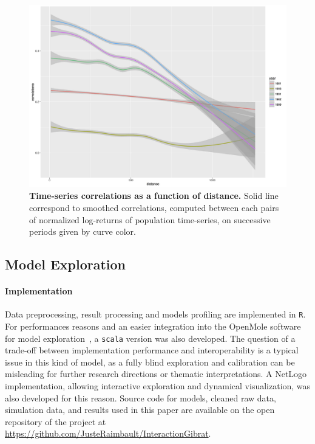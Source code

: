 \documentclass{article}
\begin{document}
\begin{figure}
\centering
\includegraphics[width=\textwidth]{Fig1.jpg}
\caption{\textbf{Time-series correlations as a function of distance.} Solid line correspond to smoothed correlations, computed between each pairs of normalized log-returns of population time-series, on successive periods given by curve color.}
\label{fig:ts-correlations}
\end{figure}







\subsection*{Model Exploration}


\paragraph{Implementation}


Data preprocessing, result processing and models profiling are implemented in \texttt{R}. For performances reasons and an easier integration into the OpenMole software for model exploration~\citep{reuillon2013openmole}, a \texttt{scala} version was also developed. The question of a trade-off between implementation performance and interoperability is a typical issue in this kind of model, as a fully blind exploration and calibration can be misleading for further research directions or thematic interpretations. A NetLogo implementation, allowing interactive exploration and dynamical visualization, was also developed for this reason. Source code for models, cleaned raw data, simulation data, and results used in this paper are available on the open repository of the project at \url{https://github.com/JusteRaimbault/InteractionGibrat}.
\end{document}

